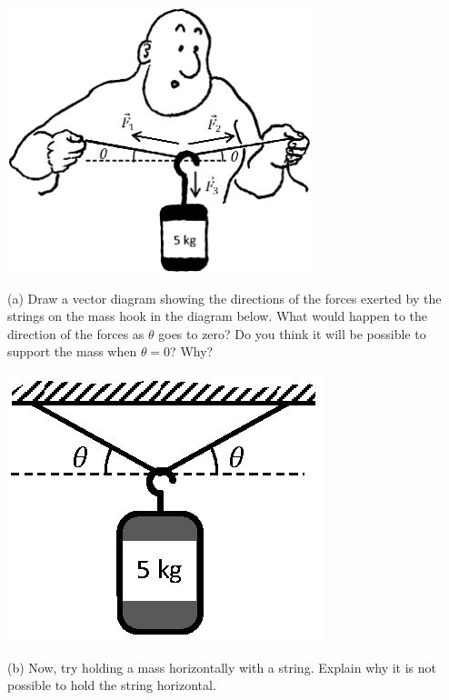 {\par\centering \includegraphics[width=3.5in]{newton/newton_fig7_new.eps} \par}

\pagebreak[3]

(a) Draw a vector diagram showing the directions of the forces exerted by the
strings on the mass hook in the diagram below. What would happen to the direction
of the forces as \( \theta  \) goes to zero? Do you think it will be possible
to support the mass when $\theta  = 0$? Why?

\vspace{0.3cm}
\hspace{0.5in}\includegraphics[scale=1.2]{newton/newton_fig8_new.eps}
\vspace{0.3cm}

(b) Now, try holding a mass horizontally with a string. Explain why it is not possible to hold the string horizontal.
\answerspace{20mm}

